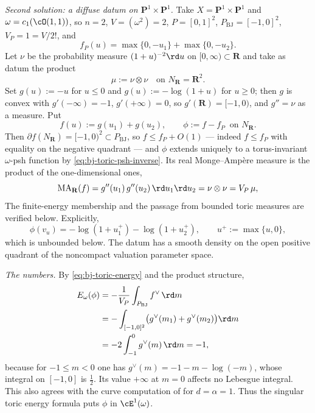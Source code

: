 \begin{example}
\emph{Second solution: a diffuse datum on $\mathbf P^1\times\mathbf P^1$.}
Take $X=\mathbf P^1\times\mathbf P^1$ and
$\omega=c_1(\cO(1,1))$, so $n=2$, $V=(\omega^2)=2$,
$P=[0,1]^2$, $P_{\mathrm{BJ}}=[-1,0]^2$, $V_P=1=V/2!$, and
\[
 f_P(u)=\max\{0,-u_1\}+\max\{0,-u_2\}.
\]
Let $\nu$ be the probability measure $(1+u)^{-2}\rd u$ on
$[0,\infty)\subset\mathbf R$ and take as datum the product
\[
 \mu:=\nu\otimes\nu\quad\text{on }N_{\mathbf R}=\mathbf R^2 .
\]
Set $g(u):=-u$ for $u\le0$ and $g(u):=-\log(1+u)$ for $u\ge0$; then
$g$ is convex with $g'(-\infty)=-1$, $g'(+\infty)=0$, so
$g'(\mathbf R)=[-1,0)$, and $g''=\nu$ as a measure.  Put
\[
 f(u):=g(u_1)+g(u_2),
 \qquad
 \phi:=f-f_P\ \text{ on }N_{\mathbf R}.
\]
Then $\partial f(N_{\mathbf R})=[-1,0)^2\subset P_{\mathrm{BJ}}$, so
$f\le f_P+O(1)$ --- indeed $f\le f_P$ with equality on the negative
quadrant --- and $\phi$ extends uniquely to a torus-invariant
$\omega$-psh function by \eqref{eq:bj-toric-psh-inverse}.  Its real
Monge--Amp\`ere measure is the product of the one-dimensional ones,
\[
 \operatorname{MA}_{\mathbf R}(f)=g''(u_1)\,g''(u_2)\,\rd u_1\rd u_2
 =\nu\otimes\nu=V_P\,\mu ,
\]
The finite-energy membership and the passage from bounded toric measures
are verified below. Explicitly,
\[
 \phi(v_u)=-\log(1+u_1^+)-\log(1+u_2^+),
 \qquad u^+:=\max\{u,0\},
\]
which is unbounded below. The datum has a smooth density on the open
positive quadrant of the noncompact valuation parameter space.

\emph{The numbers.}  By \eqref{eq:bj-toric-energy} and the product
structure,
\[
 \begin{aligned}
  E_\omega(\phi)
   &=-\frac1{V_P}\int_{P_{\mathrm{BJ}}}f^\vee\,\rd m\\
   &=-\int_{[-1,0]^2}
     \bigl(g^\vee(m_1)+g^\vee(m_2)\bigr)\rd m\\
   &=-2\int_{-1}^0g^\vee(m)\,\rd m=-1,
 \end{aligned}
\]
because for $-1\le m<0$ one has
$g^\vee(m)=-1-m-\log(-m)$, whose integral on $[-1,0]$ is
$\tfrac12$. Its value $+\infty$ at $m=0$ affects no Lebesgue
integral. This also agrees with the curve computation of
 for $d=\alpha=1$.
Thus the singular toric energy formula
puts $\phi$ in $\cE^1(\omega)$.


\end{example}
